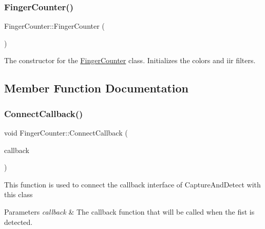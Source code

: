 \subsubsection{\texorpdfstring{Finger\+Counter()}{FingerCounter()}}
{\footnotesize\ttfamily Finger\+Counter\+::\+Finger\+Counter (\begin{DoxyParamCaption}\item[{void}]{ }\end{DoxyParamCaption})}

The constructor for the \hyperlink{classGestureDetection_1_1FingerCounter}{Finger\+Counter} class. Initializes the colors and iir filters. 

\subsection{Member Function Documentation}
\mbox{\label{classGestureDetection_1_1FingerCounter_a5b5aabaa39ff05c70a873b4c2a7869f9}} 
\subsubsection{\texorpdfstring{Connect\+Callback()}{ConnectCallback()}}
{\footnotesize\ttfamily void Finger\+Counter\+::\+Connect\+Callback (\begin{DoxyParamCaption}\item[{\hyperlink{classGestro_1_1CaptureAndDetectCallbackInterface}{Capture\+And\+Detect\+Callback\+Interface} $\ast$}]{callback }\end{DoxyParamCaption})}

This function is used to connect the callback interface of Capture\+And\+Detect with this class


\begin{DoxyParams}{Parameters}
{\em callback} & The callback function that will be called when the fist is detected. \\
\hline
\end{DoxyParams}
\mbox{\label{classGestureDetection_1_1FingerCounter_a611201352a86dd943f866c1be9507081}} 
